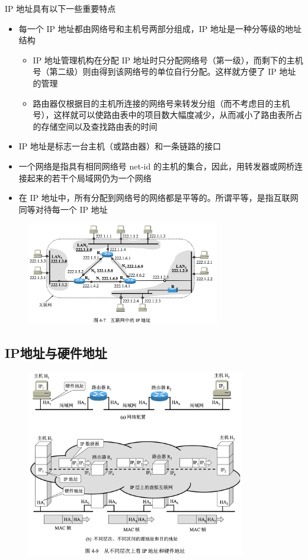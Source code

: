 \documentclass[cs4size,a4paper,10pt]{ctexart}
\begin{document}
	IP 地址具有以下一些重要特点
	\begin{itemize}
		\item 每一个 IP 地址都由网络号和主机号两部分组成，IP 地址是一种分等级的地址结构
		\begin{itemize}
			\item IP 地址管理机构在分配 IP 地址时只分配网络号（第一级），而剩下的主机号（第二级）则由得到该网络号的单位自行分配。这样就方便了 IP 地址的管理
			\item 路由器仅根据目的主机所连接的网络号来转发分组（而不考虑目的主机号），这样就可以使路由表中的项目数大幅度减少，从而减小了路由表所占的存储空间以及查找路由表的时间
		\end{itemize}
		\item IP 地址是标志一台主机（或路由器）和一条链路的接口
		\item 一个网络是指具有相同网络号 net-id 的主机的集合，因此，用转发器或网桥连接起来的若干个局域网仍为一个网络
		\item 在 IP 地址中，所有分配到网络号的网络都是平等的。所谓平等，是指互联网同等对待每一个 IP 地址
	\end{itemize}

	\begin{figure}[H]
		\centering
		\includegraphics[width=0.75\textwidth]{img/4.7}
	\end{figure}

	\subsection{IP地址与硬件地址}
	\begin{figure}[H]
		\centering
		\includegraphics[width=0.85\textwidth]{img/4.9}
	\end{figure}
\end{document}
